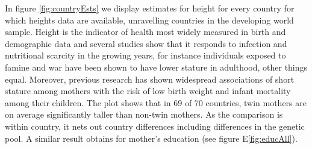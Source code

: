 \documentclass{nature}
\begin{document}
\begin{linenumbers}


In figure \ref{fig:countryEsts} we display estimates for height for every country for which heights data are available, unravelling countries in the developing world sample. Height is the indicator of health most widely measured in birth and demographic data and several studies show that it responds to infection and nutritional scarcity in the growing years, for instance individuals exposed to famine and war have been shown to have lower stature in adulthood, other things equal\cite{Silventoinen2003,Bozzolietal2009,Wangetal2010,Akreshetal2012}. Moreover, previous research has shown widespread associations of short stature among mothers with the risk of low birth weight and infant mortality among their children\cite{BhalotraRawlings2013}. The plot shows that in 69 of 70 countries, twin mothers are on average significantly taller than non-twin mothers. As the comparison is within country, it nets out country differences including differences in the genetic pool. A similar result obtains for mother's education\cite{Kenkel1991,CutlerLlerasMuney2010} (see figure E\ref{fig:educAll}).


\end{linenumbers}
\end{document}
